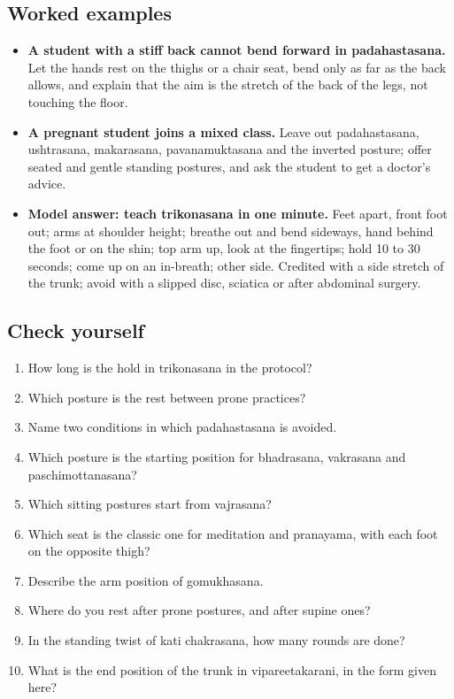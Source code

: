 \subsection*{Worked examples}
\begin{itemize}
\item \textbf{A student with a stiff back cannot bend forward in padahastasana.} Let the hands rest on the thighs or a chair seat, bend only as far as the back allows, and explain that the aim is the stretch of the back of the legs, not touching the floor.
\item \textbf{A pregnant student joins a mixed class.} Leave out padahastasana, ushtrasana, makarasana, pavanamuktasana and the inverted posture; offer seated and gentle standing postures, and ask the student to get a doctor's advice.
\item \textbf{Model answer: teach trikonasana in one minute.} Feet apart, front foot out; arms at shoulder height; breathe out and bend sideways, hand behind the foot or on the shin; top arm up, look at the fingertips; hold 10 to 30 seconds; come up on an in-breath; other side. Credited with a side stretch of the trunk; avoid with a slipped disc, sciatica or after abdominal surgery.
\end{itemize}

\subsection*{Check yourself}
\begin{enumerate}
\item How long is the hold in trikonasana in the protocol?
\item Which posture is the rest between prone practices?
\item Name two conditions in which padahastasana is avoided.
\item Which posture is the starting position for bhadrasana, vakrasana and paschimottanasana?
\item Which sitting postures start from vajrasana?
\item Which seat is the classic one for meditation and pranayama, with each foot on the opposite thigh?
\item Describe the arm position of gomukhasana.
\item Where do you rest after prone postures, and after supine ones?
\item In the standing twist of kati chakrasana, how many rounds are done?
\item What is the end position of the trunk in vipareetakarani, in the form given here?
\end{enumerate}

